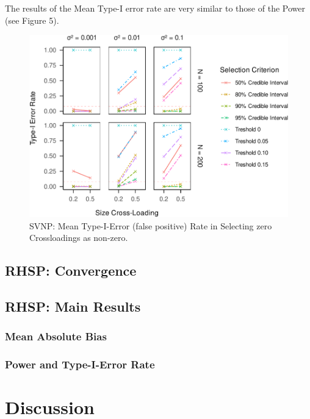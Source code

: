 \documentclass[
  man, donotrepeattitle,floatsintext]{apa6}
\begin{document}
The results of the Mean Type-I error rate are very similar to those of the Power (see Figure 5).

\begin{figure}
\centering
\includegraphics{JMBKoch_thesis_files/figure-latex/unnamed-chunk-5-1.pdf}
\caption{\label{fig:unnamed-chunk-5}SVNP: Mean Type-I-Error (false positive) Rate in Selecting zero Crossloadings as non-zero.}
\end{figure}

\hypertarget{rhsp-convergence}{%
\subsection{RHSP: Convergence}\label{rhsp-convergence}}

\hypertarget{rhsp-main-results}{%
\subsection{RHSP: Main Results}\label{rhsp-main-results}}

\hypertarget{mean-absolute-bias-2}{%
\subsubsection{Mean Absolute Bias}\label{mean-absolute-bias-2}}

\hypertarget{power-and-type-i-error-rate-2}{%
\subsubsection{Power and Type-I-Error Rate}\label{power-and-type-i-error-rate-2}}

\hypertarget{discussion}{%
\section{Discussion}\label{discussion}}
\end{document}
